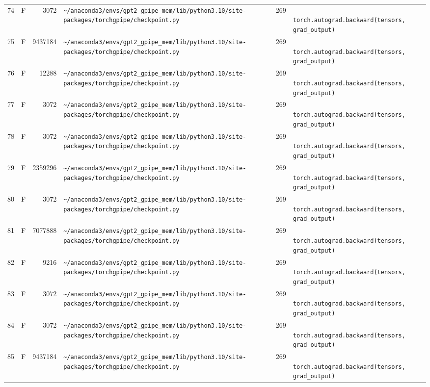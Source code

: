 \documentclass{article}
\begin{document}
\begin{longtable}{r l r p{6.5cm} r p{7.0cm}}
74 & F & 3072 & \lstinline|~/anaconda3/envs/gpt2_gpipe_mem/lib/python3.10/site-packages/torchgpipe/checkpoint.py| & 269 & \lstinline|            torch.autograd.backward(tensors, grad_output)| \\
75 & F & 9437184 & \lstinline|~/anaconda3/envs/gpt2_gpipe_mem/lib/python3.10/site-packages/torchgpipe/checkpoint.py| & 269 & \lstinline|            torch.autograd.backward(tensors, grad_output)| \\
76 & F & 12288 & \lstinline|~/anaconda3/envs/gpt2_gpipe_mem/lib/python3.10/site-packages/torchgpipe/checkpoint.py| & 269 & \lstinline|            torch.autograd.backward(tensors, grad_output)| \\
77 & F & 3072 & \lstinline|~/anaconda3/envs/gpt2_gpipe_mem/lib/python3.10/site-packages/torchgpipe/checkpoint.py| & 269 & \lstinline|            torch.autograd.backward(tensors, grad_output)| \\
78 & F & 3072 & \lstinline|~/anaconda3/envs/gpt2_gpipe_mem/lib/python3.10/site-packages/torchgpipe/checkpoint.py| & 269 & \lstinline|            torch.autograd.backward(tensors, grad_output)| \\
79 & F & 2359296 & \lstinline|~/anaconda3/envs/gpt2_gpipe_mem/lib/python3.10/site-packages/torchgpipe/checkpoint.py| & 269 & \lstinline|            torch.autograd.backward(tensors, grad_output)| \\
80 & F & 3072 & \lstinline|~/anaconda3/envs/gpt2_gpipe_mem/lib/python3.10/site-packages/torchgpipe/checkpoint.py| & 269 & \lstinline|            torch.autograd.backward(tensors, grad_output)| \\
81 & F & 7077888 & \lstinline|~/anaconda3/envs/gpt2_gpipe_mem/lib/python3.10/site-packages/torchgpipe/checkpoint.py| & 269 & \lstinline|            torch.autograd.backward(tensors, grad_output)| \\
82 & F & 9216 & \lstinline|~/anaconda3/envs/gpt2_gpipe_mem/lib/python3.10/site-packages/torchgpipe/checkpoint.py| & 269 & \lstinline|            torch.autograd.backward(tensors, grad_output)| \\
83 & F & 3072 & \lstinline|~/anaconda3/envs/gpt2_gpipe_mem/lib/python3.10/site-packages/torchgpipe/checkpoint.py| & 269 & \lstinline|            torch.autograd.backward(tensors, grad_output)| \\
84 & F & 3072 & \lstinline|~/anaconda3/envs/gpt2_gpipe_mem/lib/python3.10/site-packages/torchgpipe/checkpoint.py| & 269 & \lstinline|            torch.autograd.backward(tensors, grad_output)| \\
85 & F & 9437184 & \lstinline|~/anaconda3/envs/gpt2_gpipe_mem/lib/python3.10/site-packages/torchgpipe/checkpoint.py| & 269 & \lstinline|            torch.autograd.backward(tensors, grad_output)| \\

\end{longtable}
\end{document}
